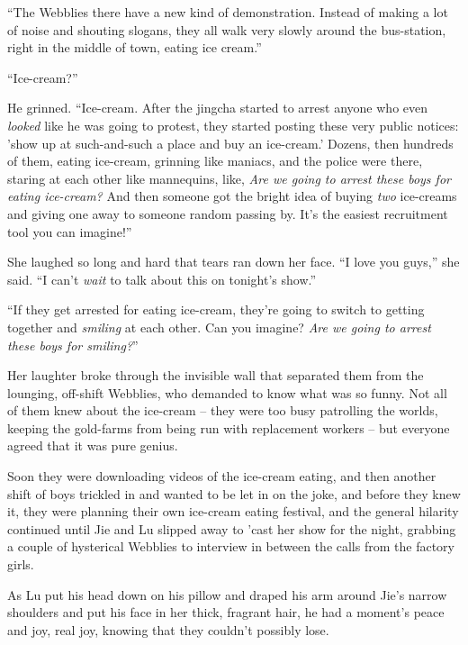 ``The Webblies there have a new kind of demonstration. Instead of
making a lot of noise and shouting slogans, they all walk very
slowly around the bus-station, right in the middle of town, eating
ice cream.''

``Ice-cream?''

He grinned. ``Ice-cream. After the jingcha started to arrest anyone
who even \emph{looked} like he was going to protest, they started
posting these very public notices: 'show up at such-and-such a
place and buy an ice-cream.' Dozens, then hundreds of them, eating
ice-cream, grinning like maniacs, and the police were there,
staring at each other like mannequins, like,
\emph{Are we going to arrest these boys for eating ice-cream?} And
then someone got the bright idea of buying \emph{two} ice-creams
and giving one away to someone random passing by. It's the easiest
recruitment tool you can imagine!''

She laughed so long and hard that tears ran down her face. ``I love
you guys,'' she said. ``I can't \emph{wait} to talk about this on
tonight's show.''

``If they get arrested for eating ice-cream, they're going to switch
to getting together and \emph{smiling} at each other. Can you
imagine? \emph{Are we going to arrest these boys for smiling?}''

Her laughter broke through the invisible wall that separated them
from the lounging, off-shift Webblies, who demanded to know what
was so funny. Not all of them knew about the ice-cream -- they were
too busy patrolling the worlds, keeping the gold-farms from being
run with replacement workers -- but everyone agreed that it was
pure genius.

Soon they were downloading videos of the ice-cream eating, and then
another shift of boys trickled in and wanted to be let in on the
joke, and before they knew it, they were planning their own
ice-cream eating festival, and the general hilarity continued until
Jie and Lu slipped away to 'cast her show for the night, grabbing a
couple of hysterical Webblies to interview in between the calls
from the factory girls.

As Lu put his head down on his pillow and draped his arm around
Jie's narrow shoulders and put his face in her thick, fragrant
hair, he had a moment's peace and joy, real joy, knowing that they
couldn't possibly lose.

\tb

